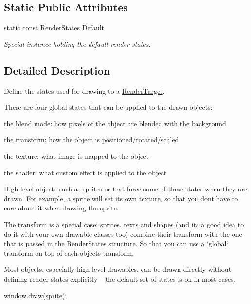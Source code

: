 \subsection*{Static Public Attributes}
\begin{DoxyCompactItemize}
\item 
\mbox{\label{classsf_1_1_render_states_ad29672df29f19ce50c3021d95f2bb062}} 
static const \hyperlink{classsf_1_1_render_states}{Render\+States} \hyperlink{classsf_1_1_render_states_ad29672df29f19ce50c3021d95f2bb062}{Default}
\begin{DoxyCompactList}\small\item\em Special instance holding the default render states. \end{DoxyCompactList}\end{DoxyCompactItemize}


\subsection{Detailed Description}
Define the states used for drawing to a \hyperlink{classsf_1_1_render_target}{Render\+Target}. 

There are four global states that can be applied to the drawn objects\+: \begin{DoxyItemize}
\item the blend mode\+: how pixels of the object are blended with the background \item the transform\+: how the object is positioned/rotated/scaled \item the texture\+: what image is mapped to the object \item the shader\+: what custom effect is applied to the object\end{DoxyItemize}
High-\/level objects such as sprites or text force some of these states when they are drawn. For example, a sprite will set its own texture, so that you don\textquotesingle{}t have to care about it when drawing the sprite.

The transform is a special case\+: sprites, texts and shapes (and it\textquotesingle{}s a good idea to do it with your own drawable classes too) combine their transform with the one that is passed in the \hyperlink{classsf_1_1_render_states}{Render\+States} structure. So that you can use a \char`\"{}global\char`\"{} transform on top of each object\textquotesingle{}s transform.

Most objects, especially high-\/level drawables, can be drawn directly without defining render states explicitly -- the default set of states is ok in most cases. 
\begin{DoxyCode}
window.draw(sprite);
\end{DoxyCode}


